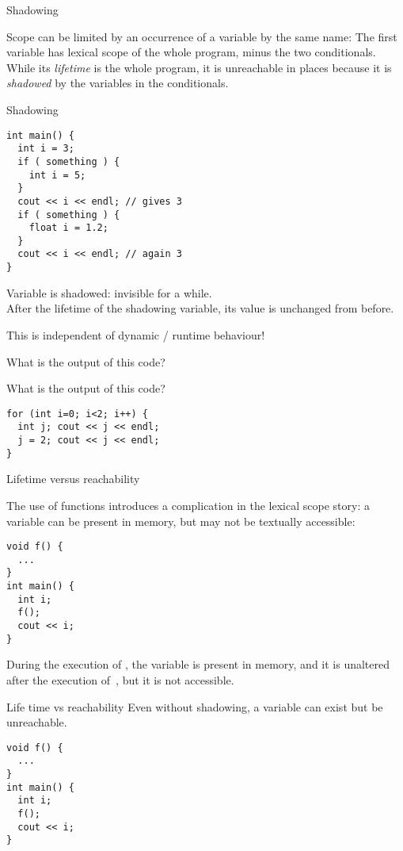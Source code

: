  {Shadowing}

Scope can be limited by an occurrence of a variable by the same name:
%
%
The first variable  has lexical scope of the whole program, minus
the two conditionals. While its
\emph{lifetime} is the whole program, it is
unreachable in places because it is
\emph{shadowed} by the variables  in the conditionals.

\begin{slide}{Shadowing}
  \label{sl:scope-shadow}
\begin{lstlisting}
int main() {
  int i = 3;
  if ( something ) {
    int i = 5;
  }
  cout << i << endl; // gives 3
  if ( something ) {
    float i = 1.2;
  }
  cout << i << endl; // again 3
}
\end{lstlisting}
Variable  is shadowed: invisible for a while.\\
After the lifetime of the shadowing variable, its value is unchanged
from before.
\end{slide}

This is independent of dynamic / runtime behaviour!

\begin{exercise}
  \label{ex:shadowfalse}
  What is the output of this code?
\end{exercise}

\begin{exercise}
  \label{ex:loopinitvar}
  What is the output of this code?
\begin{lstlisting}
for (int i=0; i<2; i++) {
  int j; cout << j << endl;
  j = 2; cout << j << endl;
}
\end{lstlisting}
\end{exercise}

 {Lifetime versus reachability}

The use of functions introduces a complication in the lexical scope story:
a variable can be present in memory, but may not be textually accessible:
\begin{lstlisting}
void f() {
  ...
}
int main() {
  int i;
  f();
  cout << i;
}
\end{lstlisting}
During the execution of , the variable  is present in
memory, and it is unaltered after the execution of~,
but it is not accessible.

\begin{slide}{Life time vs reachability}
  \label{sl:scope-lifetime}
  Even without shadowing, a variable can exist but be unreachable.
\begin{lstlisting}
void f() {
  ...
}
int main() {
  int i;
  f();
  cout << i;
}
\end{lstlisting}
\end{slide}

